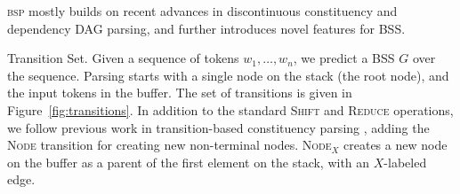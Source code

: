 \documentclass[11pt,letterpaper]{article}
\makeatletter
\newcommand{\figref}[1]{Figure~\ref{#1}}
\renewcommand{\paragraph}{
  \@startsection{paragraph}{4}
  {\z@}{.3ex \@plus .3ex \@minus .2ex}{-1em}
  {\normalfont\normalsize\bfseries}
}
\makeatother
\begin{document}
\textsc{bsp} mostly builds on recent advances in discontinuous constituency
and dependency DAG parsing, and further introduces novel features for BSS.

\paragraph{Transition Set.}
Given a sequence of tokens $w_1, \ldots, w_n$, we predict a BSS $G$ over the sequence.
Parsing starts with a single node on the stack (the root node), and the input tokens
in the buffer. The set of transitions is given in \figref{fig:transitions}.
In addition to the standard \textsc{Shift} and \textsc{Reduce} operations, 
we follow previous work in transition-based constituency parsing \cite{sagae2005classifier},
adding the \textsc{Node} transition for creating new non-terminal nodes.
\textsc{Node$_X$} creates a new node on the buffer as a parent of the first element on the stack, with an $X$-labeled edge.
\end{document}
